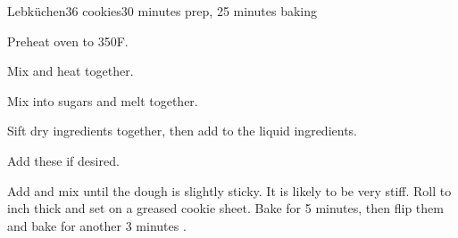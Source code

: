 \documentclass[../Cookbook.tex]{subfiles}
\begin{document}
\begin{recipe}{Lebk\"uchen}{36 cookies}{30 minutes prep, 25 minutes baking}

	Preheat oven to 350\0F.

	Mix and heat together.

	Mix into sugars and melt together.

	Sift dry ingredients together, then add to the liquid ingredients.

	Add these if desired.

	Add and mix until the dough is slightly sticky. It is likely to be very stiff. Roll to  inch thick and set on a greased cookie sheet. Bake for
	5 minutes, then flip them and bake for another 3 minutes
	.

\end{recipe}
\end{document}
